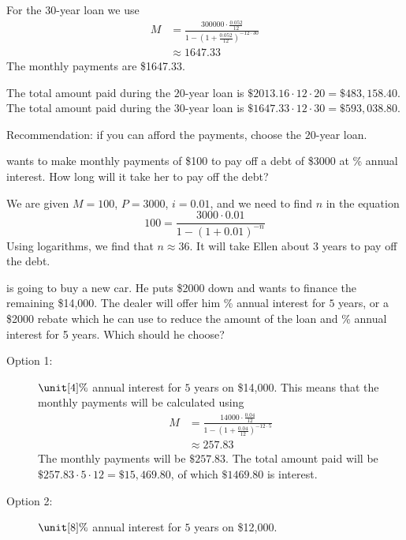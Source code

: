 \begin{problem}
\begin{subproblem}
\begin{shortsolution}
		For the $30$-year loan we use
		\begin{align*}
			M & = \frac{300000\cdot \frac{0.052}{12}}{1-\left( 1+\frac{0.052}{12} \right)^{-12\cdot 30}} \\
			  & \approx 1647.33
		\end{align*}
		The monthly payments are \$1647.33.

		The total amount paid during the $20$-year loan is $\$2013.16\cdot 12\cdot 20=\$483,158.40$.
		The total amount paid during the $30$-year loan is $\$1647.33\cdot 12\cdot 30=\$593,038.80$.

		Recommendation: if you can afford the payments, choose the $20$-year loan.
	\end{shortsolution}
\end{subproblem}
\begin{subproblem}
	 wants to make monthly payments of \$100 to pay off a debt of \$3000
	at \unit[12]{\%} annual interest. How long will it take her to pay off the
	debt?
	\begin{shortsolution}
		We are given $M=100$, $P=3000$, $i=0.01$, and we need to find $n$
		in the equation
		\[
			100 = \frac{3000\cdot 0.01}{1-(1+0.01)^{-n}}
		\]
		Using logarithms, we find that $n\approx 36$. It will take
		Ellen about $3$ years to pay off the debt.
	\end{shortsolution}
\end{subproblem}
\begin{subproblem}
	 is going to buy a new car. He puts \$2000 down and wants to finance the
	remaining \$14,000. The dealer will offer him \unit[4]{\%} annual interest for
	$5$ years, or a \$2000
	rebate which he can use to reduce the amount of the loan and \unit[8]{\%}
	annual interest for 5 years. Which should he choose?
	\begin{shortsolution}
		\begin{description}
			\item[Option 1:] $\unit[4]{\%}$ annual interest for $5$ years on \$14,000.
			This means that the monthly payments will be calculated using
			\begin{align*}
				M & = \frac{14000\cdot \frac{0.04}{12}}{1-\left( 1+\frac{0.04}{12} \right)^{-12\cdot 5}} \\
				  & \approx 257.83
			\end{align*}
			The monthly payments will be $\$257.83$. The total amount paid will be
			$\$257.83\cdot 5\cdot 12=\$15,469.80$, of which $\$1469.80$ is interest.
			\item[Option 2:] $\unit[8]{\%}$ annual interest for $5$ years on \$12,000.

\end{description}
\end{shortsolution}
\end{subproblem}
\end{problem}
